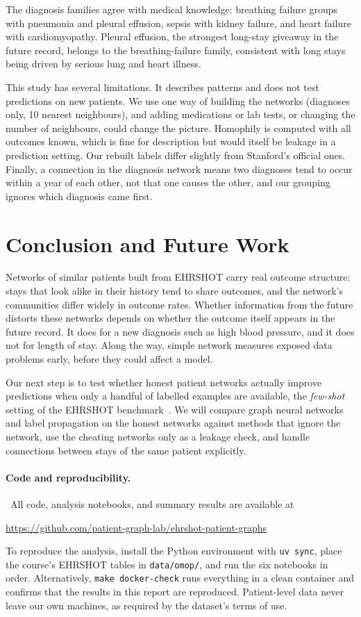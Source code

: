 \documentclass[11pt]{article}
\begin{document}
The diagnosis families agree with medical knowledge: breathing failure groups with pneumonia and pleural effusion, sepsis with kidney failure, and heart failure with cardiomyopathy. Pleural effusion, the strongest long-stay giveaway in the future record, belongs to the breathing-failure family, consistent with long stays being driven by serious lung and heart illness.

This study has several limitations. It describes patterns and does not test predictions on new patients. We use one way of building the networks (diagnoses only, 10 nearest neighbours), and adding medications or lab tests, or changing the number of neighbours, could change the picture. Homophily is computed with all outcomes known, which is fine for description but would itself be leakage in a prediction setting. Our rebuilt labels differ slightly from Stanford's official ones. Finally, a connection in the diagnosis network means two diagnoses tend to occur within a year of each other, not that one causes the other, and our grouping ignores which diagnosis came first.

\section{Conclusion and Future Work}
\label{sec:conclusion}

Networks of similar patients built from EHRSHOT carry real outcome structure: stays that look alike in their history tend to share outcomes, and the network's communities differ widely in outcome rates. Whether information from the future distorts these networks depends on whether the outcome itself appears in the future record. It does for a new diagnosis such as high blood pressure, and it does not for length of stay. Along the way, simple network measures exposed data problems early, before they could affect a model.

Our next step is to test whether honest patient networks actually improve predictions when only a handful of labelled examples are available, the \emph{few-shot} setting of the EHRSHOT benchmark~\cite{wornow2023ehrshot}. We will compare graph neural networks and label propagation on the honest networks against methods that ignore the network, use the cheating networks only as a leakage check, and handle connections between stays of the same patient explicitly.

\paragraph{Code and reproducibility.}\sloppy\ All code, analysis notebooks, and summary results are available at
\begin{center}\url{https://github.com/patient-graph-lab/ehrshot-patient-graphs}\end{center} To reproduce the analysis, install the Python environment with \texttt{uv sync}, place the course's EHRSHOT tables in \texttt{data/omop/}, and run the six notebooks in order. Alternatively, \texttt{make docker-check} runs everything in a clean container and confirms that the results in this report are reproduced. Patient-level data never leave our own machines, as required by the dataset's terms of use.



\end{document}
